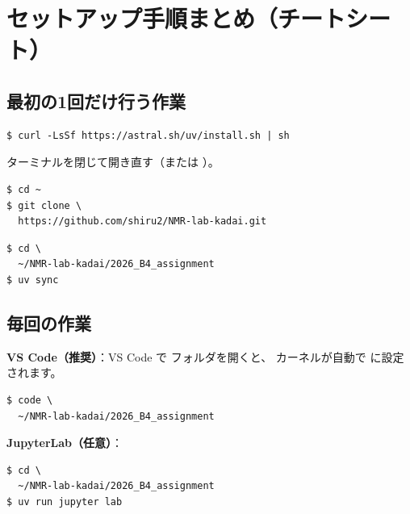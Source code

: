 \chapter{セットアップ手順まとめ（チートシート）}

\section{最初の1回だけ行う作業}

\begin{wslbox}[(1) uv のインストール]
\begin{lstlisting}[style=bash]
$ curl -LsSf https://astral.sh/uv/install.sh | sh
\end{lstlisting}
\end{wslbox}

ターミナルを閉じて開き直す（または ）。

\begin{wslbox}[(2) 課題リポジトリの取得]
\begin{lstlisting}[style=bash]
$ cd ~
$ git clone \
  https://github.com/shiru2/NMR-lab-kadai.git
\end{lstlisting}
\end{wslbox}

\begin{wslbox}
\begin{lstlisting}[style=bash]
$ cd \
  ~/NMR-lab-kadai/2026_B4_assignment
$ uv sync
\end{lstlisting}
\end{wslbox}

\section{毎回の作業}

\textbf{VS Code（推奨）}：VS Code で
 フォルダを開くと、
カーネルが自動で \cmd{.venv} に設定されます。

\begin{wslbox}
\begin{lstlisting}[style=bash]
$ code \
  ~/NMR-lab-kadai/2026_B4_assignment
\end{lstlisting}
\end{wslbox}

\textbf{JupyterLab（任意）}：

\begin{wslbox}
\begin{lstlisting}[style=bash]
$ cd \
  ~/NMR-lab-kadai/2026_B4_assignment
$ uv run jupyter lab
\end{lstlisting}
\end{wslbox}


